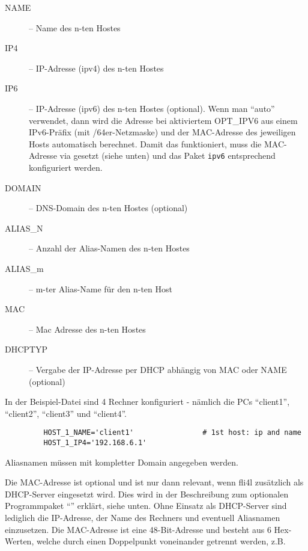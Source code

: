 \begin{description}
{      \begin{description}
      \item[NAME]         -- Name des n-ten Hostes
      \item[IP4]          -- IP-Adresse (ipv4) des n-ten Hostes
      \item[IP6]          -- IP-Adresse (ipv6) des n-ten Hostes (optional). Wenn
                             man ``auto'' verwendet, dann wird die Adresse
                             bei aktiviertem OPT\_IPV6 aus einem IPv6-Präfix
                             (mit /64er-Netzmaske) und der MAC-Adresse des
                             jeweiligen Hosts automatisch berechnet. Damit das
                             funktioniert, muss die MAC-Adresse via
                              gesetzt (siehe unten) und das
                             Paket \texttt{ipv6} entsprechend konfiguriert
                             werden.
      \item[DOMAIN]       -- DNS-Domain des n-ten Hostes (optional)
      \item[ALIAS\_N]     -- Anzahl der Alias-Namen des n-ten Hostes
      \item[ALIAS\_m]     -- m-ter Alias-Name für den n-ten Host
      \item[MAC]          -- Mac Adresse des n-ten Hostes
      \item[DHCPTYP]      -- Vergabe der IP-Adresse per DHCP abhängig von
                             MAC oder NAME (optional)
      \end{description}



      In der Beispiel-Datei sind 4 Rechner konfiguriert - nämlich die
          PCs ``client1'', ``client2'', ``client3'' und ``client4''.

\begin{example}
\begin{verbatim}
         HOST_1_NAME='client1'                # 1st host: ip and name
         HOST_1_IP4='192.168.6.1'
\end{verbatim}
\end{example}

      Aliasnamen müssen mit kompletter Domain angegeben werden.

      Die MAC-Adresse ist optional und ist nur dann relevant, wenn
      fli4l zusätzlich als DHCP-Server eingesetzt wird. Dies wird in
      der Beschreibung zum optionalen Programmpaket ``''
      erklärt, siehe unten. Ohne Einsatz als DHCP-Server sind
      lediglich die IP-Adresse, der Name des Rechners und eventuell
      Aliasnamen einzusetzen.  Die MAC-Adresse ist eine 48-Bit-Adresse
      und besteht aus 6 Hex-Werten, welche durch einen Doppelpunkt
      voneinander getrennt werden, z.B.

}
\end{description}
